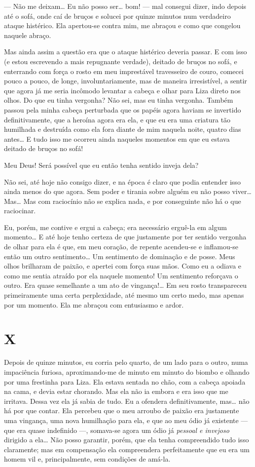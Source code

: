 --- Não me deixam\ldots{} Eu não posso ser\ldots{} bom! --- mal consegui dizer, indo
depois até o sofá, onde caí de bruços e solucei por quinze minutos num
verdadeiro ataque histérico. Ela apertou-se contra mim, me abraçou e
como que congelou naquele abraço.

Mas ainda assim a questão era que o ataque histérico deveria passar. E
com isso (e estou escrevendo a mais repugnante verdade), deitado de
bruços no sofá, e enterrando com força o rosto em meu imprestável
travesseiro de couro, comecei pouco a pouco, de longe,
involuntariamente, mas de maneira irresistível, a sentir que agora já
me seria incômodo levantar a cabeça e olhar para Liza direto nos olhos.
Do que eu tinha vergonha? Não sei, mas eu tinha vergonha. Também passou
pela minha cabeça perturbada que os papéis agora haviam se invertido
definitivamente, que a heroína agora era ela, e que eu era uma criatura
tão humilhada e destruída como ela fora diante de mim naquela noite,
quatro dias antes\ldots{} E tudo isso me ocorreu ainda naqueles momentos em
que eu estava deitado de bruços no sofá!

Meu Deus! Será possível que eu então tenha sentido inveja dela?

Não sei, até hoje não consigo dizer, e na época é claro que podia
entender isso ainda menos do que agora. Sem poder e tirania sobre
alguém eu não posso viver\ldots{} Mas\ldots{} Mas com raciocínio não se explica
nada, e por conseguinte não há o que raciocinar.

Eu, porém, me contive e ergui a cabeça; era necessário erguê-la em algum
momento\ldots{} E até hoje tenho certeza de que justamente por ter sentido
vergonha de olhar para ela é que, em meu coração, de repente acendeu-se
e inflamou-se então um outro sentimento\ldots{} Um sentimento de dominação e
de posse. Meus olhos brilharam de paixão, e apertei com força suas
mãos. Como eu a odiava e como me sentia atraído por ela naquele
momento! Um sentimento reforçava o outro. Era quase semelhante a um ato
de vingança!\ldots{} Em seu rosto transpareceu primeiramente uma certa
perplexidade, até mesmo um certo medo, mas apenas por um momento. Ela
me abraçou com entusiasmo e ardor.


\section{X}

Depois de quinze minutos, eu corria pelo quarto, de um lado para o outro, numa
impaciência furiosa, aproximando-me de minuto em minuto do biombo e olhando por
uma frestinha para Liza. Ela estava sentada no chão, com a cabeça apoiada na
cama, e devia estar chorando. Mas ela não ia embora e era isso que me irritava.
Dessa vez ela já sabia de tudo.  Eu a ofendera definitivamente, mas\ldots{} não
há por que contar. Ela percebeu que o meu arroubo de paixão era justamente uma
vingança, uma nova humilhação para ela, e que ao meu ódio já existente --- que
era quase indefinido ---, somava-se agora um ódio já \textit{pessoal e
invejoso} dirigido a ela\ldots{} Não posso garantir, porém, que ela tenha
compreendido tudo isso claramente; mas em compensação ela compreendera
perfeitamente que eu era um homem vil e, principalmente, sem condições de
amá-la.


